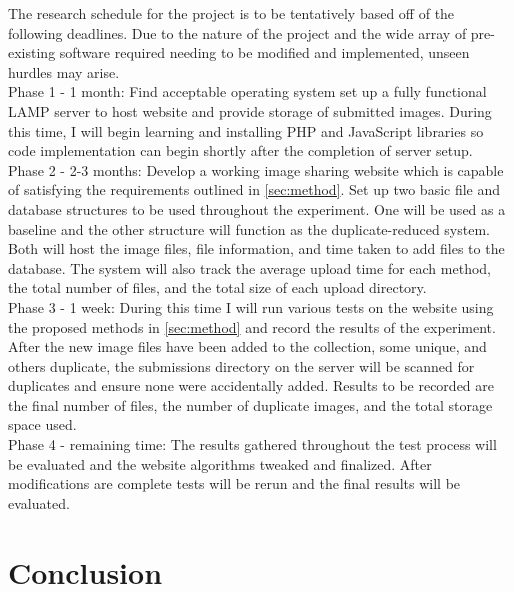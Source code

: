 \documentclass[11pt]{article}
\begin{document}
The research schedule for the project is to be tentatively based off of the following deadlines.
Due to the nature of the project and the wide array of pre-existing software required needing to
be modified and implemented, unseen hurdles may arise.\\

Phase 1 - 1 month: Find acceptable operating system set up a fully functional LAMP server to host website and provide storage of submitted images. During this time, I will begin learning and installing PHP and JavaScript libraries so code implementation can begin shortly after the completion of server setup.\\

Phase 2 - 2-3 months: Develop a working image sharing website which is capable of satisfying the requirements
outlined in \ref{sec:method}. Set up two basic file and database structures to be used throughout the experiment. One will be used as a baseline and the other structure will function as the duplicate-reduced system. Both will host the image files, file information, and time taken to add files to the database. The system will also track the average upload time for each method, the total number of files, and the total size of each upload directory.\\

Phase 3 - 1 week: During this time I will run various tests on the website using the proposed
methods in \ref{sec:method} and record the results of the experiment. After the new image files have been added to the collection, some unique, and others duplicate, the submissions directory on the server will be scanned for  duplicates and ensure none were accidentally added. Results to be recorded are the final number of files, the number of duplicate images, and the total storage space used.\\

Phase 4 - remaining time: The results gathered throughout the test process will be evaluated and
the website algorithms tweaked and finalized. After modifications are complete tests will be rerun and the
final results will be evaluated.
\vspace*{-.1in}
\section{Conclusion}
\label{sec:conclusion}
\vspace*{-.1in}

\end{document}
